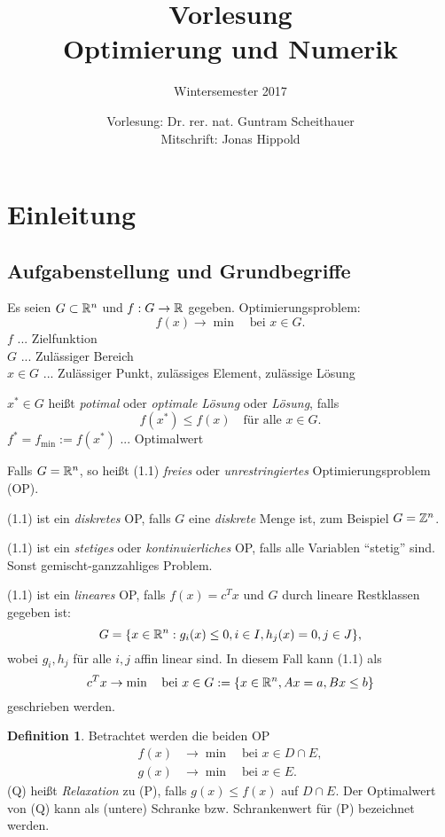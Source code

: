 \documentclass[
 a4paper,
 12pt,
 parskip=half
 ]{scrartcl}
\title{Vorlesung\\Optimierung und Numerik}
\subtitle{Wintersemester 2017}
\author{Vorlesung: Dr. rer. nat. Guntram Scheithauer\\Mitschrift: Jonas Hippold}
\theoremstyle{plain}
\theoremstyle{definition}
\newtheorem{defn}{Definition}
\numberwithin{equation}{section}
\begin{document}
\maketitle

\tableofcontents

\clearpage

\section{Einleitung}

\subsection{Aufgabenstellung und Grundbegriffe}
Es seien $G \subset \mathbb{R}^n$ und $f: G \to \mathbb{R}$ gegeben. Optimierungsproblem:
\begin{equation}
  f(x) \to \min \quad \text{bei } x \in G.
\end{equation}
$f$ ... Zielfunktion \\
$G$ ... Zulässiger Bereich \\
$x \in G$ ... Zulässiger Punkt, zulässiges Element, zulässige Lösung

$x^* \in G$  heißt \emph{potimal} oder \emph{optimale Lösung} oder
\emph{Lösung}, falls
\begin{equation}
  f(x^*) \le f(x) \quad \text{für alle } x \in G.
\end{equation}
$f^* = f_{\min} := f(x^*)$ ... Optimalwert

Falls $G = \mathbb{R}^n$, so heißt (1.1) \emph{freies} oder \emph{unrestringiertes}
Optimierungsproblem (OP).

(1.1) ist ein \emph{diskretes} OP, falls $G$ eine
\emph{diskrete} Menge ist, zum Beispiel $G = \mathbb{Z}^n$.

(1.1) ist ein \emph{stetiges} oder \emph{kontinuierliches} OP, falls alle
Variablen ``stetig'' sind. Sonst gemischt-ganzzahliges Problem.

(1.1) ist ein \emph{lineares} OP, falls $f(x) = c^T x$ und $G$ durch lineare
Restklassen gegeben ist:
\begin{equation}
  G = \{ x \in \mathbb{R}^n : g_i(x) \le 0, i \in I, h_j(x) = 0, j \in J \},
\end{equation}
wobei $g_i, h_j$ für alle $i,j$ affin linear sind. In diesem Fall kann (1.1) als
\[ c^T x \to \min \quad \text{bei } x \in G:= \{ x \in \mathbb{R}^n, Ax = a, Bx \le b
  \} \]
geschrieben werden.

\begin{defn}
  Betrachtet werden die beiden OP
  \begin{align*}
    f(x) &\to \min \quad \text{bei } x \in D \cap E, \tag{P} \\
    g(x) &\to \min \quad \text{bei } x \in E. \tag{Q}
  \end{align*}
  (Q) heißt \emph{Relaxation} zu (P), falls $g(x) \le f(x)$ auf $D \cap E$. Der
  Optimalwert von (Q) kann als (untere) Schranke bzw. Schrankenwert für (P)
  bezeichnet werden.
\end{defn}
\end{document}
